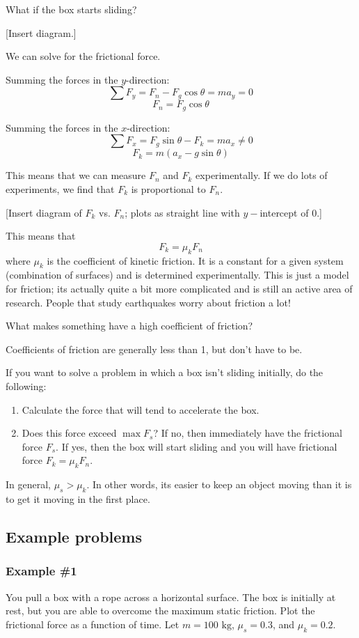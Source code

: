 What if the box starts sliding?

[Insert diagram.]
\vspace{5cm}

We can solve for the frictional force.

Summing the forces in the $y$-direction:
$$\sum F_y = F_n-F_g\cos\theta=ma_y=0$$
$$F_n=F_g\cos\theta$$

Summing the forces in the $x$-direction:
$$\sum F_x=F_g\sin\theta-F_k=ma_x\neq 0$$
$$F_k=m(a_x-g\sin\theta)$$

This means that we can measure $F_n$ and $F_k$ experimentally. If we do lots of experiments, we find that $F_k$ is proportional to $F_n$.

[Insert diagram of $F_k$ vs. $F_n$; plots as straight line with $y-$intercept of 0.]
\vspace{5cm}

This means that
$$\boxed{ F_k = \mu_k F_n}$$
where $\mu_k$ is the coefficient of kinetic friction. It is a constant for a given system (combination of surfaces) and is determined experimentally. This is just a model for friction; its actually quite a bit more complicated and is still an active area of research. People that study earthquakes worry about friction a lot!

What makes something have a high coefficient of friction?

Coefficients of friction are generally less than 1, but don't have to be.

If you want to solve a problem in which a box isn't sliding initially, do the following:
\begin{enumerate}
\item Calculate the force that will tend to accelerate the box.
\item Does this force exceed $\max F_s$? If no, then immediately have the frictional force $F_s$. If yes, then the box will start sliding and you will have frictional force $F_k=\mu_k F_n$.
\end{enumerate}
In general, $\mu_s>\mu_k$. In other words, its easier to keep an object moving than it is to get it moving in the first place.

\subsection{Example problems}
\subsubsection{Example \#1}
You pull a box with a rope across a horizontal surface. The box is initially at rest, but you are able to overcome the maximum static friction. Plot the frictional force as a function of time. Let $m=100\mbox{ kg}$, $\mu_s=0.3$, and $\mu_k=0.2$.

